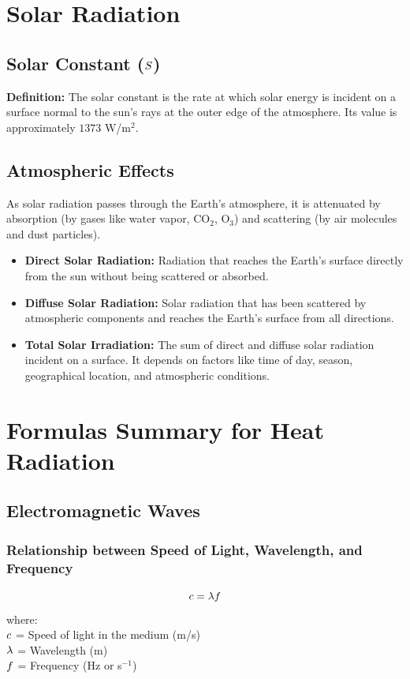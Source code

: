 \section{Solar Radiation}

\subsection{Solar Constant ($S$)}
\textbf{Definition:} The solar constant is the rate at which solar energy is incident on a surface normal to the sun's rays at the outer edge of the atmosphere. Its value is approximately $1373$ W/m$^2$.

\subsection{Atmospheric Effects}
As solar radiation passes through the Earth's atmosphere, it is attenuated by absorption (by gases like water vapor, CO$_2$, O$_3$) and scattering (by air molecules and dust particles).
\begin{itemize}
    \item \textbf{Direct Solar Radiation:} Radiation that reaches the Earth's surface directly from the sun without being scattered or absorbed.
    \item \textbf{Diffuse Solar Radiation:} Solar radiation that has been scattered by atmospheric components and reaches the Earth's surface from all directions.
    \item \textbf{Total Solar Irradiation:} The sum of direct and diffuse solar radiation incident on a surface. It depends on factors like time of day, season, geographical location, and atmospheric conditions.
\end{itemize}

\section{Formulas Summary for Heat Radiation}

\subsection{Electromagnetic Waves}
\subsubsection*{Relationship between Speed of Light, Wavelength, and Frequency}
\begin{equation}
    c = \lambda f
\end{equation}
where: \\
$c$ = Speed of light in the medium (m/s) \\
$\lambda$ = Wavelength (m) \\
$f$ = Frequency (Hz or s$^{-1}$)

